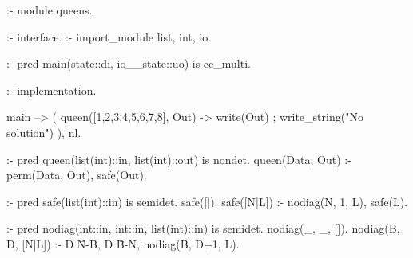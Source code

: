 \begin{prologcode}
:- module queens.

:- interface.
:- import_module list, int, io.

:- pred main(state::di, io__state::uo) is cc_multi.

:- implementation.

main -->
         (   {queen([1,2,3,4,5,6,7,8], Out)} -> write(Out)
         ;   write_string("No solution")
         ), nl.

:- pred queen(list(int)::in, list(int)::out) is nondet.
queen(Data, Out) :-
         perm(Data, Out),
         safe(Out).

:- pred safe(list(int)::in) is semidet.
safe([]).
safe([N|L]) :-
         nodiag(N, 1, L),
         safe(L).

:- pred nodiag(int::in, int::in, list(int)::in) is semidet.
nodiag(_, _, []).
nodiag(B, D, [N|L]) :-
         D \= N-B, D \= B-N,
         nodiag(B, D+1, L).
\end{prologcode}
